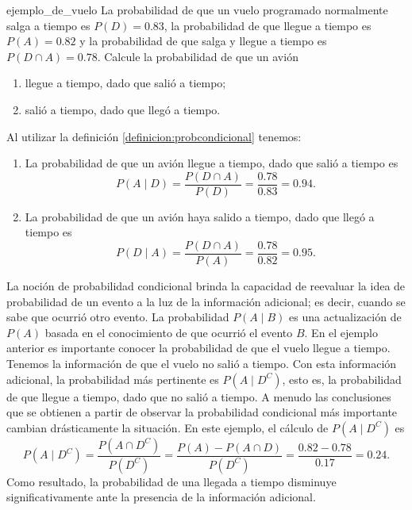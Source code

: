\begin{examplebox}{}{ejemplo_de_vuelo}
    La probabilidad de que un vuelo programado normalmente salga a tiempo es $P(D) = 0.83$, la probabilidad de que llegue a tiempo es $P(A) = 0.82$ y la probabilidad de que salga y llegue a tiempo es $P(D \cap A) = 0.78$. Calcule la probabilidad de que un avión
    \begin{enumerate}[label=\alph*), topsep=6pt, itemsep=0pt]
        \item llegue a tiempo, dado que salió a tiempo;
        \item salió a tiempo, dado que llegó a tiempo.
    \end{enumerate}
    \tcblower
    \solucion Al utilizar la definición \ref{definicion:probcondicional} tenemos:
    \begin{enumerate}[label=\alph*), topsep=6pt, itemsep=0pt]
        \item La probabilidad de que un avión llegue a tiempo, dado que salió a tiempo es
        $$P(A \mid D) = \frac{P(D \cap A)}{P(D)} = \frac{0.78}{0.83} = 0.94.$$
        \item La probabilidad de que un avión haya salido a tiempo, dado que llegó a tiempo es
        $$P(D \mid A) = \frac{P(D \cap A)}{P(A)} = \frac{0.78}{0.82} = 0.95.$$
    \end{enumerate}
\end{examplebox}

La noción de probabilidad condicional brinda la capacidad de reevaluar la idea de probabilidad de un evento a la luz de la información adicional; es decir, cuando se sabe que ocurrió otro evento. La probabilidad $P(A \mid B)$ es una actualización de $P(A)$ basada en el conocimiento de que ocurrió el evento $B$. En el ejemplo anterior es importante conocer la probabilidad de que el vuelo llegue a tiempo. Tenemos la información de que el vuelo no salió a tiempo. Con esta información adicional, la probabilidad más pertinente es $P\left( A \mid D^C \right)$, esto es, la probabilidad de que llegue a tiempo, dado que no salió a tiempo. A menudo las conclusiones que se obtienen a partir de observar la probabilidad condicional más importante cambian drásticamente la situación. En este ejemplo, el cálculo de $P\left( A \mid D^C \right)$ es
$$P\left( A \mid D^C \right) = \frac{P\left(A \cap D^C\right)}{P\left(D^C\right)} = \frac{P(A) - P(A \cap D)}{P\left(D^C\right)} = \frac{0.82 - 0.78}{0.17} = 0.24.$$
Como resultado, la probabilidad de una llegada a tiempo disminuye significativamente ante la presencia de la información adicional.

